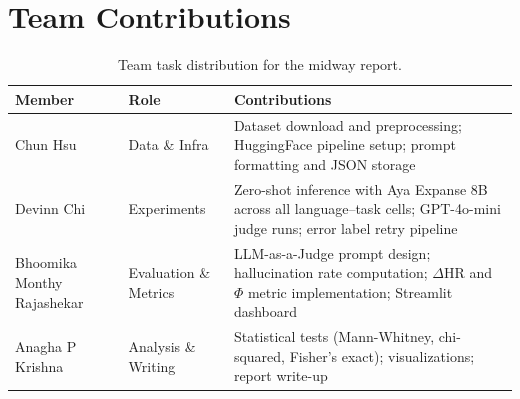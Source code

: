 \documentclass[11pt]{article}
\begin{document}
\clearpage
\section*{Team Contributions}

\begin{table}[h]
\centering
\small
\begin{tabular}{p{2.2cm} p{1.8cm} p{4.2cm}}
\toprule
\textbf{Member} & \textbf{Role} & \textbf{Contributions} \\
\midrule
Chun Hsu
  & Data \& Infra
  & Dataset download and preprocessing;
    HuggingFace pipeline setup;
    prompt formatting and JSON storage \\
\addlinespace
Devinn Chi
  & Experiments
  & Zero-shot inference with Aya Expanse 8B
    across all language--task cells;
    GPT-4o-mini judge runs;
    error label retry pipeline \\
\addlinespace
Bhoomika Monthy Rajashekar
  & Evaluation \& Metrics
  & LLM-as-a-Judge prompt design;
    hallucination rate computation;
    $\Delta$HR and $\Phi$ metric implementation;
    Streamlit dashboard \\
\addlinespace
Anagha P Krishna
  & Analysis \& Writing
  & Statistical tests (Mann-Whitney,
    chi-squared, Fisher's exact);
    visualizations; report write-up \\
\bottomrule
\end{tabular}
\caption{Team task distribution for the midway report.}
\label{tab:team}
\end{table}



\end{document}
